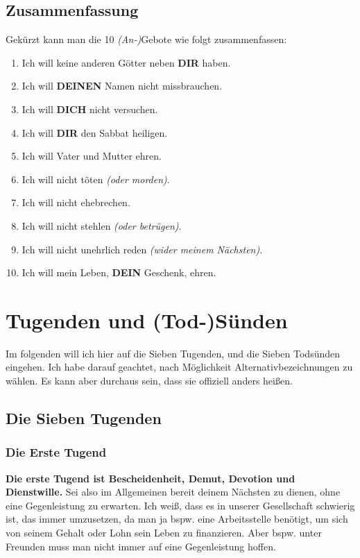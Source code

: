 \documentclass[10pt,a5paper]{article}
\newcommand{\Deinen}[0]{\textbf{DEINEN}}
\newcommand{\Dein}[0]{\textbf{DEIN}}
\newcommand{\Dich}[0]{\textbf{DICH}}
\newcommand{\Dir}[0]{\textbf{DIR}}
\begin{document}
	\subsection{Zusammenfassung}
		Gek\"urzt kann man die 10 \textit{(An-)}Gebote wie folgt zusammenfassen:
		\\
		\begin{enumerate}[nosep]
			\item Ich will keine anderen G\"otter neben {\Dir} haben.
			\item Ich will {\Deinen} Namen nicht missbrauchen.
			\item Ich will {\Dich} nicht versuchen.
			\item Ich will {\Dir} den Sabbat heiligen.
			\item Ich will Vater und Mutter ehren.
			\item Ich will nicht t\"oten \textit{(oder morden)}.
			\item Ich will nicht ehebrechen.
			\item Ich will nicht stehlen \textit{(oder betr\"ugen)}.
			\item Ich will nicht unehrlich reden \textit{(wider meinem N\"achsten)}.
			\item Ich will mein Leben, {\Dein} Geschenk, ehren.
		\end{enumerate}
	
	\newpage
	\section{Tugenden und (Tod-)S\"unden}
		Im folgenden will ich hier auf die Sieben Tugenden,
		und die Sieben Tods\"unden eingehen.
		Ich habe darauf geachtet,
		nach M\"oglichkeit Alternativbezeichnungen zu w\"ahlen.
		Es kann aber durchaus sein,
		dass sie offiziell anders hei{\ss}en.
	
	\subsection{Die Sieben Tugenden}
	
	\subsubsection{Die Erste Tugend}
		\textbf{Die erste Tugend ist Bescheidenheit,
		Demut,
		Devotion und Dienstwille.}
		Sei also im Allgemeinen bereit deinem N\"achsten zu dienen,
		ohne eine Gegenleistung zu erwarten.
		Ich wei{\ss},
		dass es in unserer Gesellschaft schwierig ist,
		das immer umzusetzen,
		da man ja bspw. eine Arbeitsstelle ben\"otigt,
		um sich von seinem Gehalt oder Lohn sein Leben zu finanzieren.
		Aber bspw. unter Freunden muss man nicht immer auf eine Gegenleistung hoffen.
\end{document}
